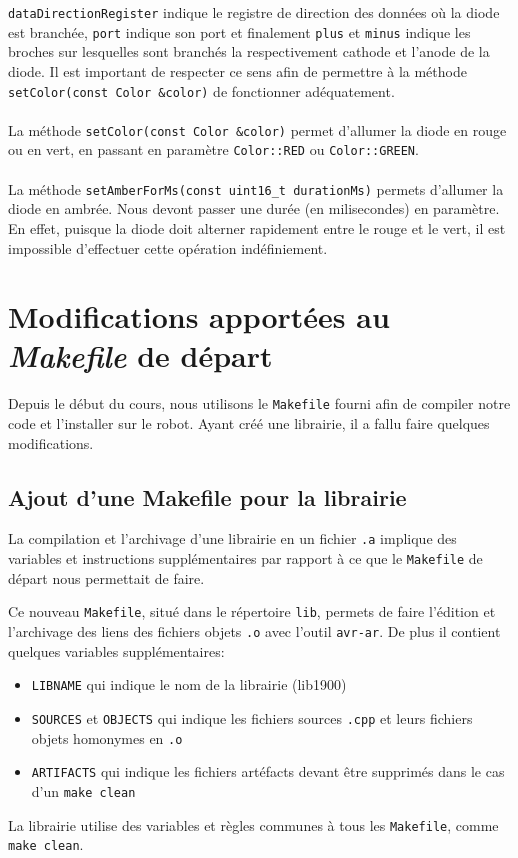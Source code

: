 \documentclass[12pt]{scrartcl}
\begin{document}
\verb|dataDirectionRegister| indique le registre de direction des données où la
diode est branchée, \verb|port| indique son port et finalement
\verb|plus| et \verb|minus| indique les broches sur lesquelles sont branchés la
respectivement cathode et l'anode de la diode. Il est important de respecter ce
sens afin de permettre à la méthode \verb|setColor(const Color &color)| de
fonctionner adéquatement.
\\ \\
La méthode \verb|setColor(const Color &color)| permet d'allumer la diode en rouge
ou en vert, en passant en paramètre \verb|Color::RED| ou \verb|Color::GREEN|.
\\ \\
La méthode \verb|setAmberForMs(const uint16_t durationMs)| permets d'allumer la
diode en ambrée. Nous devont passer une durée (en milisecondes) en paramètre. En
effet, puisque la diode doit alterner rapidement entre le rouge et le vert, il
est impossible d'effectuer cette opération indéfiniement.
\newpage
\section{Modifications apportées au \textit{Makefile} de départ}
Depuis le début du cours, nous utilisons le \verb|Makefile| fourni afin de
compiler notre code et l'installer sur le robot. Ayant créé une librairie, il a
fallu faire quelques modifications.
\subsection{Ajout d'une Makefile pour la librairie}
La compilation et l'archivage d'une librairie en un fichier \verb|.a| implique
des variables et instructions supplémentaires par rapport à ce que le
\verb|Makefile| de départ nous permettait de faire.

Ce nouveau \verb|Makefile|,
situé dans le répertoire \verb|lib|, permets de faire l'édition et l'archivage
des liens des fichiers objets \verb|.o| avec l'outil \verb|avr-ar|. De plus il
contient quelques variables supplémentaires:
\begin{itemize}
    \item \verb|LIBNAME| qui indique le nom de la librairie (lib1900)
    \item \verb|SOURCES| et \verb|OBJECTS| qui indique les fichiers sources \verb|.cpp|
          et leurs fichiers objets homonymes en \verb|.o|
    \item \verb|ARTIFACTS| qui indique les fichiers artéfacts devant être supprimés
          dans le cas d'un \verb|make clean|
\end{itemize}
La librairie utilise des variables et règles communes à tous les \verb|Makefile|,
comme \verb|make clean|.
\end{document}
